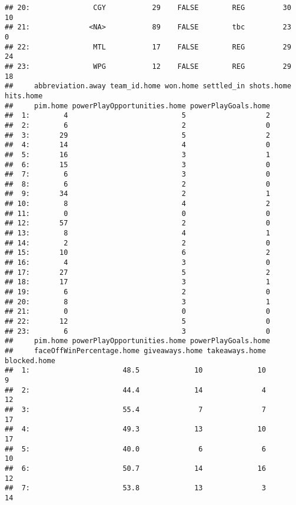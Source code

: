 \documentclass[
]{article}
\begin{document}
\begin{verbatim}
## 20:               CGY           29    FALSE        REG         30        10
## 21:              <NA>           89    FALSE        tbc         23         0
## 22:               MTL           17    FALSE        REG         29        24
## 23:               WPG           12    FALSE        REG         29        18
##     abbreviation.away team_id.home won.home settled_in shots.home hits.home
##     pim.home powerPlayOpportunities.home powerPlayGoals.home
##  1:        4                           5                   2
##  2:        6                           2                   0
##  3:       29                           5                   2
##  4:       14                           4                   0
##  5:       16                           3                   1
##  6:       15                           3                   0
##  7:        6                           3                   0
##  8:        6                           2                   0
##  9:       34                           2                   1
## 10:        8                           4                   2
## 11:        0                           0                   0
## 12:       57                           2                   0
## 13:        8                           4                   1
## 14:        2                           2                   0
## 15:       10                           6                   2
## 16:        4                           3                   0
## 17:       27                           5                   2
## 18:       17                           3                   1
## 19:        6                           2                   0
## 20:        8                           3                   1
## 21:        0                           0                   0
## 22:       12                           5                   0
## 23:        6                           3                   0
##     pim.home powerPlayOpportunities.home powerPlayGoals.home
##     faceOffWinPercentage.home giveaways.home takeaways.home blocked.home
##  1:                      48.5             10             10            9
##  2:                      44.4             14              4           12
##  3:                      55.4              7              7           17
##  4:                      49.3             13             10           17
##  5:                      40.0              6              6           10
##  6:                      50.7             14             16           12
##  7:                      53.8             13              3           14

\end{verbatim}
\end{document}
